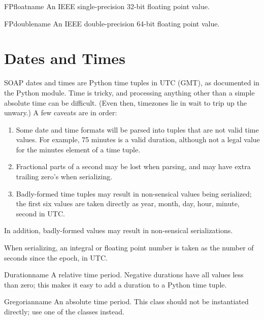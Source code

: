 \begin{classdesc}{FPfloat}{name}
An IEEE single-precision 32-bit floating point value.
\end{classdesc}

\begin{classdesc}{FPdouble}{name}
An IEEE double-precision 64-bit floating point value.
\end{classdesc}

\section{Dates and Times}

SOAP dates and times are Python time tuples in UTC (GMT), as documented
in the Python  module.
Time is tricky, and processing anything other than a simple absolute time
can be difficult.
(Even then, timezones lie in wait to trip up the unwary.)
A few caveats are in order:

\begin{enumerate}

\item
Some date and time formats will be parsed into tuples that are
not valid time values.
For example, 75 minutes is a valid duration, although not a legal value
for the minutes element of a time tuple.

\item
Fractional parts of a second may be lost when parsing, and may have
extra trailing zero's when serializing.

\item
Badly-formed time tuples may result in non-sensical values being serialized;
the first six values are taken directly as year, month, day, hour, minute,
second in UTC.

\end{enumerate}

In addition, badly-formed values may result in non-sensical serializations.

When serializing, an integral or floating point number is taken as
the number of seconds since the epoch, in UTC.

\begin{classdesc}{Duration}{name}
A relative time period.
Negative durations have all values less than zero; this makes
it easy to add a duration to a Python time tuple.
\end{classdesc}

\begin{classdesc}{Gregorian}{name}
An absolute time period.
This class should not be instantiated directly; use one of the 
classes instead.
\end{classdesc}

